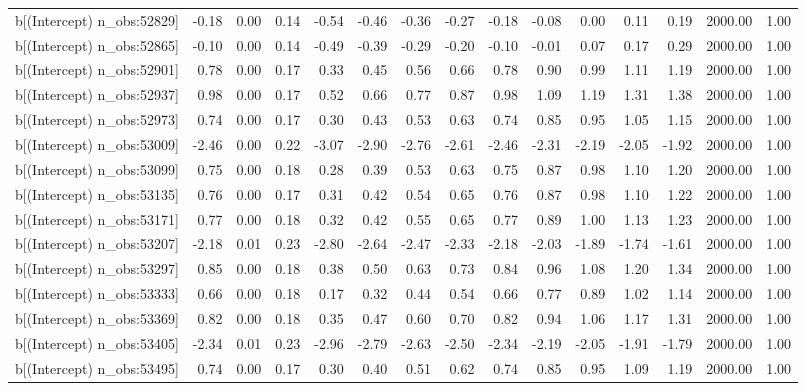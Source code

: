 \begin{table}[ht]
\begin{tabular}{rrrrrrrrrrrrrrr}
  b[(Intercept) n\_obs:52829] & -0.18 & 0.00 & 0.14 & -0.54 & -0.46 & -0.36 & -0.27 & -0.18 & -0.08 & 0.00 & 0.11 & 0.19 & 2000.00 & 1.00 \\ 
  b[(Intercept) n\_obs:52865] & -0.10 & 0.00 & 0.14 & -0.49 & -0.39 & -0.29 & -0.20 & -0.10 & -0.01 & 0.07 & 0.17 & 0.29 & 2000.00 & 1.00 \\ 
  b[(Intercept) n\_obs:52901] & 0.78 & 0.00 & 0.17 & 0.33 & 0.45 & 0.56 & 0.66 & 0.78 & 0.90 & 0.99 & 1.11 & 1.19 & 2000.00 & 1.00 \\ 
  b[(Intercept) n\_obs:52937] & 0.98 & 0.00 & 0.17 & 0.52 & 0.66 & 0.77 & 0.87 & 0.98 & 1.09 & 1.19 & 1.31 & 1.38 & 2000.00 & 1.00 \\ 
  b[(Intercept) n\_obs:52973] & 0.74 & 0.00 & 0.17 & 0.30 & 0.43 & 0.53 & 0.63 & 0.74 & 0.85 & 0.95 & 1.05 & 1.15 & 2000.00 & 1.00 \\ 
  b[(Intercept) n\_obs:53009] & -2.46 & 0.00 & 0.22 & -3.07 & -2.90 & -2.76 & -2.61 & -2.46 & -2.31 & -2.19 & -2.05 & -1.92 & 2000.00 & 1.00 \\ 
  b[(Intercept) n\_obs:53099] & 0.75 & 0.00 & 0.18 & 0.28 & 0.39 & 0.53 & 0.63 & 0.75 & 0.87 & 0.98 & 1.10 & 1.20 & 2000.00 & 1.00 \\ 
  b[(Intercept) n\_obs:53135] & 0.76 & 0.00 & 0.17 & 0.31 & 0.42 & 0.54 & 0.65 & 0.76 & 0.87 & 0.98 & 1.10 & 1.22 & 2000.00 & 1.00 \\ 
  b[(Intercept) n\_obs:53171] & 0.77 & 0.00 & 0.18 & 0.32 & 0.42 & 0.55 & 0.65 & 0.77 & 0.89 & 1.00 & 1.13 & 1.23 & 2000.00 & 1.00 \\ 
  b[(Intercept) n\_obs:53207] & -2.18 & 0.01 & 0.23 & -2.80 & -2.64 & -2.47 & -2.33 & -2.18 & -2.03 & -1.89 & -1.74 & -1.61 & 2000.00 & 1.00 \\ 
  b[(Intercept) n\_obs:53297] & 0.85 & 0.00 & 0.18 & 0.38 & 0.50 & 0.63 & 0.73 & 0.84 & 0.96 & 1.08 & 1.20 & 1.34 & 2000.00 & 1.00 \\ 
  b[(Intercept) n\_obs:53333] & 0.66 & 0.00 & 0.18 & 0.17 & 0.32 & 0.44 & 0.54 & 0.66 & 0.77 & 0.89 & 1.02 & 1.14 & 2000.00 & 1.00 \\ 
  b[(Intercept) n\_obs:53369] & 0.82 & 0.00 & 0.18 & 0.35 & 0.47 & 0.60 & 0.70 & 0.82 & 0.94 & 1.06 & 1.17 & 1.31 & 2000.00 & 1.00 \\ 
  b[(Intercept) n\_obs:53405] & -2.34 & 0.01 & 0.23 & -2.96 & -2.79 & -2.63 & -2.50 & -2.34 & -2.19 & -2.05 & -1.91 & -1.79 & 2000.00 & 1.00 \\ 
  b[(Intercept) n\_obs:53495] & 0.74 & 0.00 & 0.17 & 0.30 & 0.40 & 0.51 & 0.62 & 0.74 & 0.85 & 0.95 & 1.09 & 1.19 & 2000.00 & 1.00 \\ 

\end{tabular}
\end{table}
